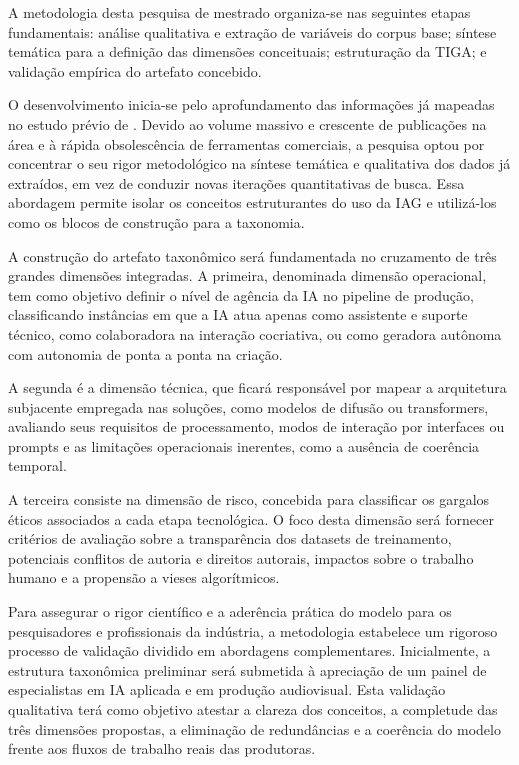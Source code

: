 A metodologia desta pesquisa de mestrado organiza-se nas seguintes etapas fundamentais: análise qualitativa e extração de variáveis do corpus base; síntese temática para a definição das dimensões conceituais; estruturação da TIGA; e validação empírica do artefato concebido.

O desenvolvimento inicia-se pelo aprofundamento das informações já mapeadas no estudo prévio de \citet{RothAleo2026}. Devido ao volume massivo e crescente de publicações na área e à rápida obsolescência de ferramentas comerciais, a pesquisa optou por concentrar o seu rigor metodológico na síntese temática e qualitativa dos dados já extraídos, em vez de conduzir novas iterações quantitativas de busca. Essa abordagem permite isolar os conceitos estruturantes do uso da IAG e utilizá-los como os blocos de construção para a taxonomia.

A construção do artefato taxonômico será fundamentada no cruzamento de três grandes dimensões integradas. A primeira, denominada dimensão operacional, tem como objetivo definir o nível de agência da IA no pipeline de produção, classificando instâncias em que a IA atua apenas como assistente e suporte técnico, como colaboradora na interação cocriativa, ou como geradora autônoma com autonomia de ponta a ponta na criação. 

A segunda é a dimensão técnica, que ficará responsável por mapear a arquitetura subjacente empregada nas soluções, como modelos de difusão ou transformers, avaliando seus requisitos de processamento, modos de interação por interfaces ou prompts e as limitações operacionais inerentes, como a ausência de coerência temporal. 

A terceira consiste na dimensão de risco, concebida para classificar os gargalos éticos associados a cada etapa tecnológica. O foco desta dimensão será fornecer critérios de avaliação sobre a transparência dos datasets de treinamento, potenciais conflitos de autoria e direitos autorais, impactos sobre o trabalho humano e a propensão a vieses algorítmicos.

Para assegurar o rigor científico e a aderência prática do modelo para os pesquisadores e profissionais da indústria, a metodologia estabelece um rigoroso processo de validação dividido em abordagens complementares. Inicialmente, a estrutura taxonômica preliminar será submetida à apreciação de um painel de especialistas em IA aplicada e em produção audiovisual. Esta validação qualitativa terá como objetivo atestar a clareza dos conceitos, a completude das três dimensões propostas, a eliminação de redundâncias e a coerência do modelo frente aos fluxos de trabalho reais das produtoras.

